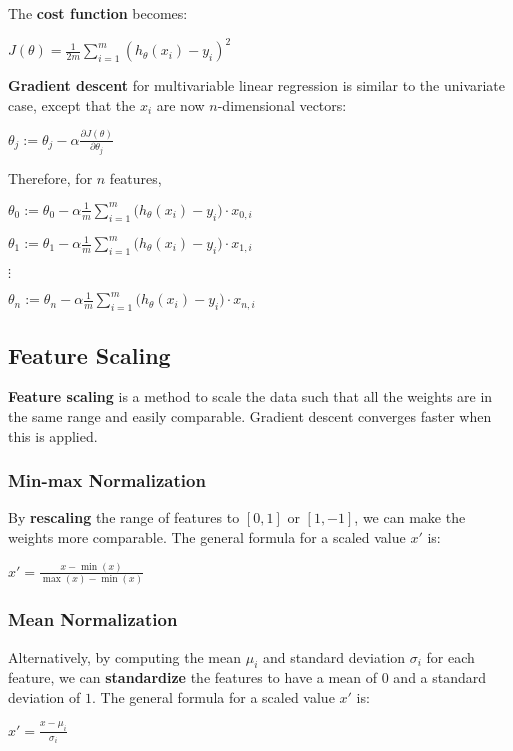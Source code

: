         The \textbf{cost function} becomes:

        $J(\theta) = \frac{1}{2m} \sum_{i=1}^m (h_\theta(x_i) - y_i)^2$

        \textbf{Gradient descent} for multivariable linear regression is similar to the univariate case, except that the $x_i$ are now $n$-dimensional vectors:

        $\theta_j := \theta_j - \alpha \frac{\partial J(\theta)}{\partial \theta_j}$

        Therefore, for $n$ features,

        $\theta_0 := \theta_0 - \alpha \frac{1}{m} \sum_{i=1}^m \big( h_\theta(x_i) - y_i \big) \cdot x_{0,i}$

        $\theta_1 := \theta_1 - \alpha \frac{1}{m} \sum_{i=1}^m \big( h_\theta(x_i) - y_i \big) \cdot x_{1,i}$

        $\vdots$

        $\theta_n := \theta_n - \alpha \frac{1}{m} \sum_{i=1}^m \big( h_\theta(x_i) - y_i \big) \cdot x_{n,i}$

    \subsection{Feature Scaling}
        \textbf{Feature scaling} is a method to scale the data such that all the weights are in the same range and easily comparable. Gradient descent converges faster when this is applied.

        \subsubsection{Min-max Normalization}
            By \textbf{rescaling} the range of features to $[0, 1]$ or $[1, -1]$, we can make the weights more comparable. The general formula for a scaled value $x'$ is:

            $x' = \frac{x - \min(x)}{\max(x) - \min(x)}$

        \subsubsection{Mean Normalization}
            Alternatively, by computing the mean $\mu_i$ and standard deviation $\sigma_i$ for each feature, we can \textbf{standardize} the features to have a mean of $0$ and a standard deviation of $1$.
            The general formula for a scaled value $x'$ is:

            $x' = \frac{x - \mu_i}{\sigma_i}$


